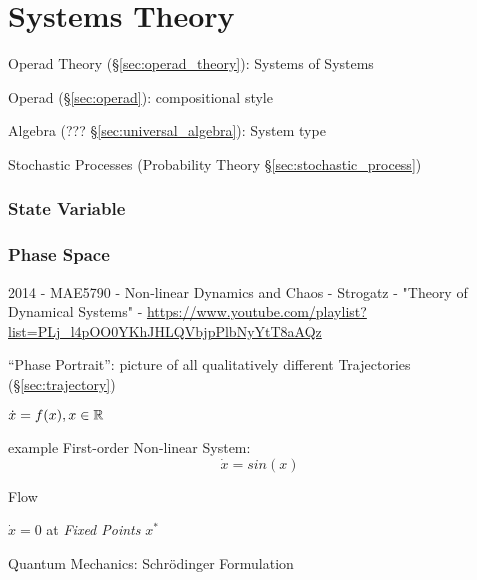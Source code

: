 \part{Systems Theory}\label{sec:systems_theory}


Operad Theory (\S\ref{sec:operad_theory}): Systems of Systems

Operad (\S\ref{sec:operad}): compositional style

Algebra (??? \S\ref{sec:universal_algebra}): System type

Stochastic Processes (Probability Theory \S\ref{sec:stochastic_process})



\section{State Variable}\label{sec:state_variable}

\section{Phase Space}\label{sec:phase_space}

2014 - MAE5790 - Non-linear Dynamics and Chaos - Strogatz - "Theory of
Dynamical Systems" -
\url{https://www.youtube.com/playlist?list=PLj_l4pOO0YKhJHLQVbjpPlbNyYtT8aAQz}

``Phase Portrait'': picture of all qualitatively different Trajectories
(\S\ref{sec:trajectory})

$\dot{x} = f(x), x \in \mathbb{R}$

example First-order Non-linear System:
\[
  \dot{x} = sin(x)
\]

Flow

$\dot{x} = 0$ at \emph{Fixed Points} $x^*$


\asterism


Quantum Mechanics: Schr\"odinger Formulation

